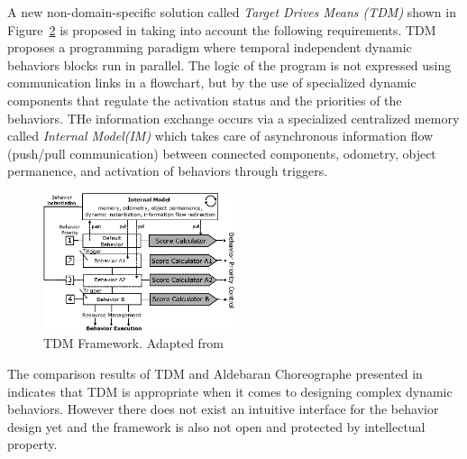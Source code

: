 {\begin{figure}[H]
\label{fig:visprog}
\end{figure}
A new non-domain-specific solution called \emph{Target Drives Means (TDM)} shown in Figure~\ref{fig:tdm_im} is proposed in \cite{berenz2014targets} taking into account the following requirements. TDM proposes a programming paradigm where temporal independent dynamic behaviors blocks run in parallel. The logic of the program is not expressed using communication links in a flowchart, but by the use of specialized dynamic components that regulate the activation status and the priorities of the behaviors. THe information exchange occurs via a specialized centralized memory called \emph{Internal Model(IM)} which takes care of asynchronous information flow (push/pull communication) between connected components, odometry, object permanence, and activation of behaviors through triggers. 
\begin{figure}[H]
\centering
\includegraphics[width=0.5\textwidth]{assets/tdm_im.eps}
\caption[Target-drives-means Framework]{TDM Framework. {Adapted from \cite{berenz2014targets}}}
\label{fig:tdm_im}
\end{figure}
The comparison results of TDM and Aldebaran Choreographe presented in \cite{berenz2014targets} indicates that TDM is appropriate when it comes to designing complex dynamic behaviors. However there does not exist an intuitive interface for the behavior design yet and the framework is also not open and protected by intellectual property.

}
